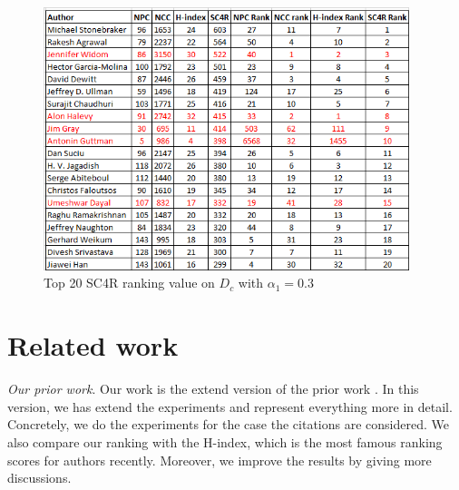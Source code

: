 \documentclass[10pt,leqno,twoside]{article}
\begin{document}
\begin{figure} %
	\caption{Top 20 SC4R ranking value on $D_c$ with $\alpha_1=0.3$}
	\label{Fig:Top20AuthorDetail}
    \centering
    \includegraphics[width=0.95\textwidth]{Dct20SC4Ra-f}
\end{figure}
%

\section{Related work}\label{Sect:Related}
\textit{Our prior work}. Our work is the extend version of the prior work \cite{Vu14}. In this version, we has extend the experiments and represent everything more in detail. Concretely, we do the experiments for the case the citations are considered. We also compare our ranking with the H-index, which is the most famous ranking scores for authors recently. Moreover, we improve the results by giving more discussions.
\end{document}
